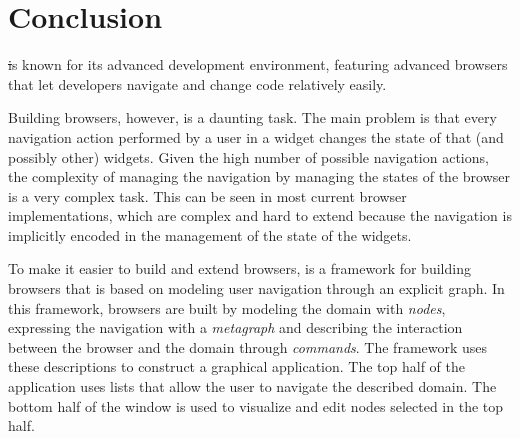 \documentclass[a4paper,10pt,twoside]{book}
\begin{document}


\section{Conclusion} 



\st is known for its advanced development environment, featuring advanced browsers that let developers navigate and change code relatively easily.


Building browsers, however, is a daunting task. The main problem is that every navigation action performed by a user in a widget changes the state of that (and possibly other) widgets. Given the high number of possible navigation actions, the complexity of managing the navigation by managing the states of the browser is a very complex task.
This can be seen in most current browser implementations, which are complex and hard to extend because the navigation is implicitly encoded in the management of the state of the widgets.
 

To make it easier to build and extend browsers, \ob is a framework for building browsers that is based on modeling user navigation through an explicit graph.
In this framework, browsers are built by modeling the domain with \emph{nodes}, expressing the navigation with a \emph{metagraph} and describing the interaction between the browser and the domain through \emph{commands}. 
The framework uses these descriptions to construct a graphical application. The top half of the application uses lists that allow the user to navigate the described domain. The bottom half of the window is used to visualize and edit nodes selected in the top half.
\end{document}
